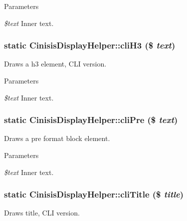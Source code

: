 \begin{DoxyParams}{Parameters}
\item[{\em \$text}]Inner text. \end{DoxyParams}
\hypertarget{classCinisisDisplayHelper_a1ed9ee357ffda8e2efd885a6eae20550}{
\subsubsection[{cliH3}]{\setlength{\rightskip}{0pt plus 5cm}static CinisisDisplayHelper::cliH3 (\$ {\em text})}}
\label{classCinisisDisplayHelper_a1ed9ee357ffda8e2efd885a6eae20550}
Draws a h3 element, CLI version.


\begin{DoxyParams}{Parameters}
\item[{\em \$text}]Inner text. \end{DoxyParams}
\hypertarget{classCinisisDisplayHelper_a50bf73bd3722766cbae1b46b3092453d}{
\subsubsection[{cliPre}]{\setlength{\rightskip}{0pt plus 5cm}static CinisisDisplayHelper::cliPre (\$ {\em text})}}
\label{classCinisisDisplayHelper_a50bf73bd3722766cbae1b46b3092453d}
Draws a pre format block element.


\begin{DoxyParams}{Parameters}
\item[{\em \$text}]Inner text. \end{DoxyParams}
\hypertarget{classCinisisDisplayHelper_a8f0c8aec5b11a144b14278d287238c85}{
\subsubsection[{cliTitle}]{\setlength{\rightskip}{0pt plus 5cm}static CinisisDisplayHelper::cliTitle (\$ {\em title})}}
\label{classCinisisDisplayHelper_a8f0c8aec5b11a144b14278d287238c85}
Draws title, CLI version.


